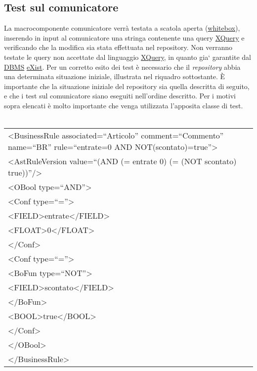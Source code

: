 \subsection{Test sul comunicatore}
La macrocomponente comunicatore verr\`a testata a scatola aperta (\underline{whitebox}), inserendo in input al comunicatore una stringa contenente una query \underline{XQuery} e verificando che la modifica sia stata effettuata nel repository. Non verranno testate le query non accettate dal linguaggio \underline{XQuery}, in quanto gia` garantite dal \underline{DBMS} \underline{eXist}. Per un corretto esito dei test \`e necessario che il \textit{repository} abbia una determinata situazione iniziale, illustrata nel riquadro sottostante. \`E importante che la situazione iniziale del repository sia quella descritta di seguito, e che i test sul comunicatore siano eseguiti nell'ordine descritto. Per i motivi sopra elencati \`e molto importante che venga utilizzata l'apposita classe di test. \\
\\

\begin{center}
\begin{tabular}{|p{11cm}|} \hline
\textless BusinessRule associated=``Articolo'' comment=``Commento'' name=``BR'' rule=``entrate=0 AND NOT(scontato)=true''\textgreater \\
\textless AstRuleVersion value=``(AND (= entrate 0) (= (NOT scontato) true))''/\textgreater \\
 \textless OBool type=``AND''\textgreater \\
 \textless Conf type=``=''\textgreater \\
 \textless FIELD\textgreater entrate\textless /FIELD\textgreater \\
 \textless FLOAT\textgreater 0\textless /FLOAT\textgreater \\
 \textless /Conf\textgreater \\
 \textless Conf type=``=''\textgreater \\
\textless BoFun type=``NOT''\textgreater \\
 \textless FIELD\textgreater scontato\textless /FIELD\textgreater \\
\textless /BoFun\textgreater \\
 \textless BOOL\textgreater true\textless /BOOL\textgreater \\
\textless /Conf\textgreater \\
\textless /OBool\textgreater \\
\textless /BusinessRule\textgreater\\ \hline
\end{tabular} \\
\end{center}

